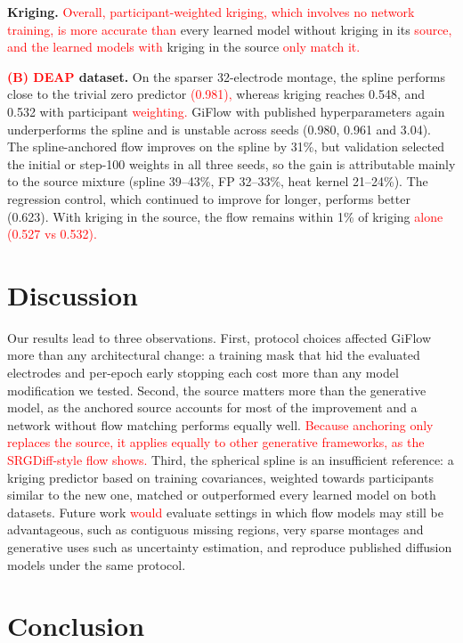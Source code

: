 \documentclass{article}
\begin{document}
\textbf{Kriging.} \textcolor{red}{Overall, participant-weighted kriging, which involves no
network training, is more accurate than} every learned model without
kriging in its \textcolor{red}{source, and the learned models with} kriging in the source
\textcolor{red}{only match it.}

\textbf{\textcolor{red}{(B) DEAP} dataset.} On the sparser 32-electrode montage, the spline performs
close to the trivial zero predictor \textcolor{red}{(0.981),} whereas kriging
reaches 0.548, and 0.532 with participant \textcolor{red}{weighting.} GiFlow
with published hyperparameters again underperforms the spline and is
unstable across seeds (0.980, 0.961 and 3.04). The spline-anchored flow
improves on the spline by 31\%, but validation selected the initial or
step-100 weights in all three seeds, so the gain is attributable mainly
to the source mixture (spline 39--43\%, FP 32--33\%, heat kernel
21--24\%). The regression control, which continued to improve for longer,
performs better (0.623). With kriging in the source, the flow remains
within 1\% of kriging \textcolor{red}{alone (0.527 vs 0.532).}

\section{Discussion}
\label{sec:discussion}

Our results lead to three observations. First, protocol choices affected
GiFlow more than any architectural change: a training mask that hid the
evaluated electrodes and per-epoch early stopping each cost more than any
model modification we tested. Second, the source matters more than the
generative model, as the anchored source accounts for most of the
improvement and a network without flow matching performs equally well.
\textcolor{red}{Because anchoring only replaces the source, it applies equally to other
generative frameworks, as the SRGDiff-style flow shows.} Third, the
spherical spline is an insufficient reference: a kriging
predictor based on training covariances, weighted towards participants
similar to the new one, matched or outperformed every learned model on
both datasets.
Future work \textcolor{red}{would} evaluate settings in which flow models may still be
advantageous, such as contiguous missing regions, very sparse montages and
generative uses such as uncertainty estimation, and reproduce
published diffusion models under the same protocol.

\section{Conclusion}
\label{sec:conclusion}
\end{document}
